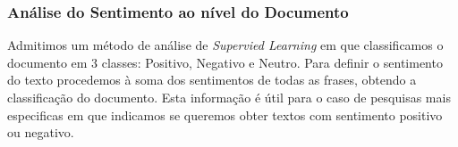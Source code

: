 \subsubsection{Análise do Sentimento ao nível do Documento}
\hspace{15pt}Admitimos um método de análise de \textit{Supervied Learning} em que classificamos o documento em 3 classes: Positivo, Negativo e Neutro. Para definir o sentimento do texto procedemos à soma dos sentimentos de todas as frases, obtendo a classificação do documento. Esta informação é útil para o caso de pesquisas mais especificas em que indicamos se queremos obter textos com sentimento positivo ou negativo.

